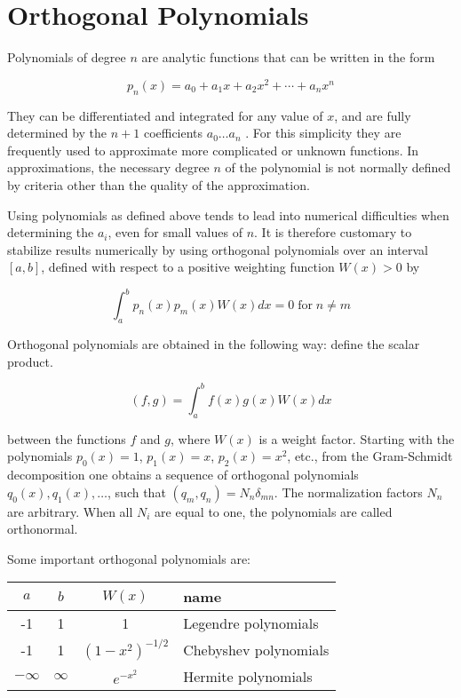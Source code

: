 \documentclass{article}
\begin{document}
\section{Orthogonal Polynomials}

Polynomials of degree $n$ are analytic functions that can be written in the form

$$ p_n(x) = a_0 + a_1 x + a_2 x^2 + \cdots + a_n x^n $$

They can be differentiated and integrated for any value of $x$, and are fully determined by the $n+1$ coefficients $a_0 \ldots a_n$ . For this simplicity they are frequently used to approximate more complicated or unknown functions. In approximations, the necessary degree $n$ of the polynomial is not normally defined by criteria other than the quality of the approximation.

Using polynomials as defined above tends to lead into numerical difficulties when determining the $a_i$, even for small values of $n$. It is therefore customary to stabilize results numerically by using orthogonal polynomials over an interval $[a,b]$, defined with respect to a positive weighting function $W(x) > 0$ by

$$ \int_a^b p_n(x)p_m(x) W(x) dx = 0 \; \text{for} \; n \ne m $$

Orthogonal polynomials are obtained in the following way: define the scalar product.

$$ (f,g) = \int_a^b f(x)g(x)W(x) dx $$

between the functions $f$ and $g$, where $W(x)$ is a weight factor. Starting with the polynomials $p_0(x)=1$, $p_1(x)=x$, $p_2(x)=x^2$, etc., from the Gram-Schmidt decomposition one obtains a sequence of orthogonal polynomials $q_0(x),q_1(x),\ldots$, such that $(q_m,q_n)=N_n \delta_{mn}$. The normalization factors $N_n$ are arbitrary. When all $N_i$ are equal to one, the polynomials are called orthonormal.

Some important orthogonal polynomials are:

\begin{center}
\begin{tabular}{cccl}
$a$ & $b$ & $W(x)$ & name \\
\hline
-1  & 1   &  1     & Legendre polynomials \\
-1  & 1   &  $(1-x^2)^{-1/2}$ & Chebyshev polynomials \\
$-\infty$ & $\infty$ & $e^{-x^2}$ & Hermite polynomials
\end{tabular}
\end{center}
\end{document}
